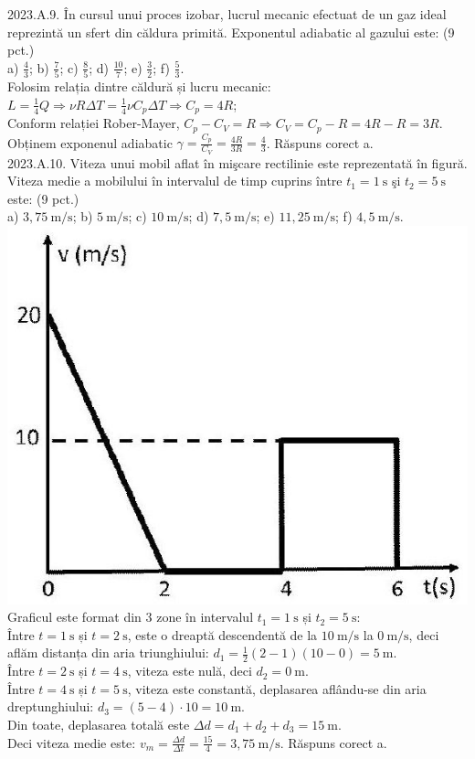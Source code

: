 2023.A.9. În cursul unui proces izobar, lucrul mecanic efectuat de un gaz ideal reprezintă un sfert din căldura primită. Exponentul adiabatic al gazului este: (9 pct.)\\ a) $\frac{4}{3}$; b) $\frac{7}{5}$; c) $\frac{8}{5}$; d) $\frac{10}{7}$; e) $\frac{3}{2}$; f) $\frac{5}{3}$.\\ Folosim relația dintre căldură și lucru mecanic:\\ $L=\frac{1}{4} Q \Rightarrow \nu R \Delta T=\frac{1}{4} \nu C_{p} \Delta T \Rightarrow C_{p}=4 R$;\\ Conform relației Rober-Mayer, $C_{p}-C_{V}=R \Rightarrow C_{V}=C_{p}-R=4 R-R=3 R$.\\ Obținem exponenul adiabatic $\gamma=\frac{C_{p}}{C_{V}}=\frac{4 R}{3 R}=\frac{4}{3}$. Răspuns corect a.\\ 

2023.A.10. Viteza unui mobil aflat în mişcare rectilinie este reprezentată în figură. Viteza medie a mobilului în intervalul de timp cuprins între $t_{1}=1 \mathrm{~s}$ şi $t_{2}=5 \mathrm{~s}$ este: (9 pct.)\\ a) $3,75 \mathrm{~m} / \mathrm{s}$; b) $5 \mathrm{~m} / \mathrm{s}$; c) $10 \mathrm{~m} / \mathrm{s}$; d) $7,5 \mathrm{~m} / \mathrm{s}$; e) $11,25 \mathrm{~m} / \mathrm{s}$; f) $4,5 \mathrm{~m} / \mathrm{s}$.\\ \includegraphics[width=0.4\linewidth]{images/2025_08_19_17c3b9471cd89f0defc4g-02}\\ Graficul este format din 3 zone în intervalul $t_{1}=1 \mathrm{~s}$ și $t_{2}=5 \mathrm{~s}$:\\ Între $t=1 \mathrm{~s}$ și $t=2 \mathrm{~s}$, este o dreaptă descendentă de la $10 \mathrm{~m} / \mathrm{s}$ la $0 \mathrm{~m} / \mathrm{s}$, deci aflăm distanța din aria triunghiului: $d_{1}=\frac{1}{2}(2-1)(10-0)=5 \mathrm{~m}$.\\ Între $t=2 \mathrm{~s}$ și $t=4 \mathrm{~s}$, viteza este nulă, deci $d_{2}=0 \mathrm{~m}$.\\ Între $t=4 \mathrm{~s}$ și $t=5 \mathrm{~s}$, viteza este constantă, deplasarea aflându-se din aria dreptunghiului: $d_{3}=(5-4) \cdot 10=10 \mathrm{~m}$.\\ Din toate, deplasarea totală este $\Delta d=d_{1}+d_{2}+d_{3}=15 \mathrm{~m}$.\\ Deci viteza medie este: $v_{m}=\frac{\Delta d}{\Delta t}=\frac{15}{4}=3,75 \mathrm{~m} / \mathrm{s}$. Răspuns corect a.\\
